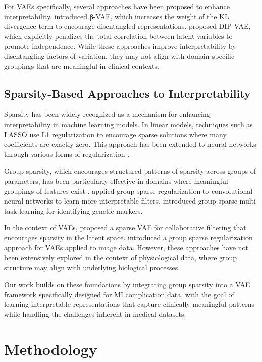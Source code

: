 \documentclass[oupdraft]{bio}
\begin{document}
For VAEs specifically, several approaches have been proposed to enhance interpretability. \citet{Higgins2017} introduced β-VAE, which increases the weight of the KL divergence term to encourage disentangled representations. \citet{Kumar2018} proposed DIP-VAE, which explicitly penalizes the total correlation between latent variables to promote independence. While these approaches improve interpretability by disentangling factors of variation, they may not align with domain-specific groupings that are meaningful in clinical contexts.

\subsection{Sparsity-Based Approaches to Interpretability}

Sparsity has been widely recognized as a mechanism for enhancing interpretability in machine learning models. In linear models, techniques such as LASSO \citep{Tibshirani1996} use L1 regularization to encourage sparse solutions where many coefficients are exactly zero. This approach has been extended to neural networks through various forms of regularization \citep{Collins2014}.

Group sparsity, which encourages structured patterns of sparsity across groups of parameters, has been particularly effective in domains where meaningful groupings of features exist \citep{Yuan2006}. \citet{Ranzato2008} applied group sparse regularization to convolutional neural networks to learn more interpretable filters. \citet{Lozano2011} introduced group sparse multi-task learning for identifying genetic markers.

In the context of VAEs, \citet{Yeung2017} proposed a sparse VAE for collaborative filtering that encourages sparsity in the latent space. \citet{Li2019} introduced a group sparse regularization approach for VAEs applied to image data. However, these approaches have not been extensively explored in the context of physiological data, where group structure may align with underlying biological processes.

Our work builds on these foundations by integrating group sparsity into a VAE framework specifically designed for MI complication data, with the goal of learning interpretable representations that capture clinically meaningful patterns while handling the challenges inherent in medical datasets.

\section{Methodology}
\label{sec3}
\end{document}

